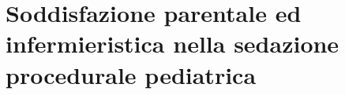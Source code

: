 \bigskip
\begin{comment}


\section{Background}

Sebbene la sedazione per le procedure diagnostiche o terapeutiche sia pratica quotidiana in ambito pediatrico, esiste ancora poca letteratura focalizzata sulla qualità della sedazione e del risveglio seguente. Sono noti e ben documentati \citep{Bellolio2016, Hartlin2016}, invece, i profili di sicurezza ed efficacia dei farmaci disponibili per tale finalità. Una panoramica sulle caratteristiche farmacologiche, indicazioni, posologia ed effetti avversi dei più comuni agenti sedativi è riportata nell'appendice B. %

\end{comment}
\newpage

\section{Soddisfazione parentale ed infermieristica nella sedazione procedurale pediatrica}

